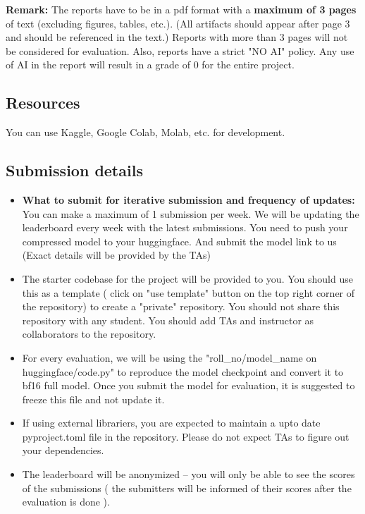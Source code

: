\documentclass[11pt]{article}
\begin{document}
\textbf{Remark:} The reports have to be in a pdf format with a \textbf{maximum of 3 pages} of text (excluding figures, tables, etc.). (All artifacts should appear after page 3 and should be referenced in the text.) {\color{red}Reports with more than 3 pages will not be considered for evaluation.} Also, reports have a strict "NO AI" policy. Any use of AI in the report will result in a grade of 0 for the entire project.


\subsection{Resources}
You can use Kaggle, Google Colab, Molab, etc. for development. 

\subsection{Submission details}
\begin{itemize}
    \item \textbf{What to submit for iterative submission and frequency of updates:} You can make a maximum of 1 submission per week. We will be updating the leaderboard every week with the latest submissions. You need to push your compressed model to your huggingface. And submit the model link to us (Exact details will be provided by the TAs)
    \item The starter codebase for the project will be provided to you. You should use this as a template ( click on "use template" button on the top right corner of the repository) to create a "private" repository. You should not share this repository with any student. You should add TAs and instructor as collaborators to the repository.
    \item For every evaluation, we will be using the "roll\_no/\<model\_name on huggingface\>/code.py" to reproduce the model checkpoint and convert it to bf16 full model. Once you submit the model for evaluation, it is suggested to freeze this file and not update it.
    \item If using external librariers, you are expected to maintain a upto date pyproject.toml file in the repository. Please do not expect TAs to figure out your dependencies.
    \item The leaderboard will be anonymized -- you will only be able to see the scores of the submissions ( the submitters will be informed of their scores after the evaluation is done ).
\end{itemize}
\end{document}
